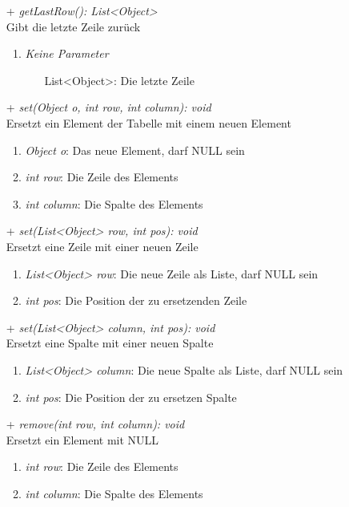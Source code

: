 \begin{itemize}
	\item[+] \textit{getLastRow(): List<Object>} \\
	Gibt die letzte Zeile zurück
		\begin{enumerate}
			\item \textit{Keine Parameter}
			\begin{itemize}
				\item[] List<Object>: Die letzte Zeile
			\end{itemize}
		\end{enumerate}
	
	\item[+] \textit{set(Object o, int row, int column): void} \\
	Ersetzt ein Element der Tabelle mit einem neuen Element
	\begin{enumerate}
		\item \textit{Object o}: Das neue Element, darf NULL sein
		\item \textit{int row}: Die Zeile des Elements
		\item \textit{int column}: Die Spalte des Elements
	\end{enumerate}

	\item[+] \textit{set(List<Object> row, int pos): void} \\
	Ersetzt eine Zeile mit einer neuen Zeile
	\begin{enumerate}
		\item \textit{List<Object> row}: Die neue Zeile als Liste, darf NULL sein
		\item \textit{int pos}: Die Position der zu ersetzenden Zeile
	\end{enumerate}

	\item[+] \textit{set(List<Object> column, int pos): void} \\
	Ersetzt eine Spalte mit einer neuen Spalte
	\begin{enumerate}
		\item \textit{List<Object> column}: Die neue Spalte als Liste, darf NULL sein
		\item \textit{int pos}: Die Position der zu ersetzen Spalte
	\end{enumerate}

	\item[+] \textit{remove(int row, int column): void} \\
	Ersetzt ein Element mit NULL
	\begin{enumerate}
		\item \textit{int row}: Die Zeile des Elements
		\item \textit{int column}: Die Spalte des Elements
	\end{enumerate}


\end{itemize}
